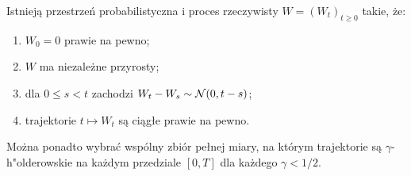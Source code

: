 \begin{twierdzenie}
\label{thm:wiener-exists}
Istnieją przestrzeń probabilistyczna i proces rzeczywisty
$W=(W_t)_{t\ge0}$ takie, że:
\begin{enumerate}
\item $W_0=0$ prawie na pewno;
\item $W$ ma niezależne przyrosty;
\item dla $0\le s<t$ zachodzi
$W_t-W_s\sim\mathcal{N}(0,t-s)$;
\item trajektorie $t\mapsto W_t$ są ciągłe prawie na pewno.
\end{enumerate}
Można ponadto wybrać wspólny zbiór pełnej miary,
na którym trajektorie są $\gamma$-h"olderowskie
na każdym przedziale $[0,T]$ dla każdego $\gamma<1/2$.
\end{twierdzenie}
